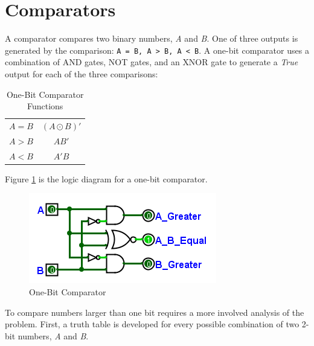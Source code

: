 \section{Comparators}
\label{CL:sec:comparators}

A comparator compares two binary numbers, \emph{A} and \emph{B}. One of three outputs is generated by the comparison: \lstinline[]|A = B, A > B, A < B|. A one-bit comparator uses a combination of \textsf{AND} gates, \textsf{NOT} gates, and an \textsf{XNOR} gate to generate a \emph{True} output for each of the three comparisons: 

\begin{table}[H]
  \sffamily
  \newcommand{\head}[1]{\textcolor{white}{\textbf{#1}}}    
  \begin{center}
    \begin{tabular}{cc} 
      $ A=B $ & $ (A \odot B)' $ \\
      $ A > B $ & $ AB' $ \\
      $ A < B $ & $ A'B $
    \end{tabular}
  \end{center}
  \caption{One-Bit Comparator Functions}
  \label{CL:tab:one-bit_comparator_functions}
\end{table}

Figure \ref{fig:08_12} is the logic diagram for a one-bit comparator.  

\begin{figure}[H]
	\centering
	\includegraphics[width=\maxwidth{.95\linewidth}]{gfx/08_12}
	\caption{One-Bit Comparator}
	\label{fig:08_12}
\end{figure}

To compare numbers larger than one bit requires a more involved analysis of the problem. First, a truth table is developed for every possible combination of two 2-bit numbers, \emph{A} and \emph{B}.

